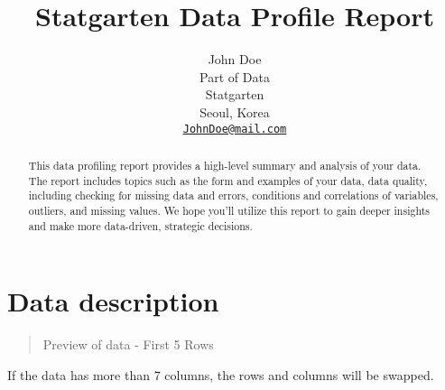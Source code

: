 \documentclass{article}
\title{Statgarten Data Profile Report}
\author{
    John Doe
   \\
    Part of Data \\
    Statgarten \\
  Seoul, Korea \\
  \texttt{\href{mailto:JohnDoe@mail.com}{\nolinkurl{JohnDoe@mail.com}}} \\
  }
\begin{document}
\maketitle


\begin{abstract}
This data profiling report provides a high-level summary and analysis of
your data. The report includes topics such as the form and examples of
your data, data quality, including checking for missing data and errors,
conditions and correlations of variables, outliers, and missing values.
We hope you'll utilize this report to gain deeper insights and make more
data-driven, strategic decisions.
\end{abstract}


\newpage

\hypertarget{data-description}{%
\section{Data description}\label{data-description}}

\begin{quote}
Preview of data - First 5 Rows
\end{quote}

If the data has more than 7 columns, the rows and columns will be
swapped.
\end{document}
